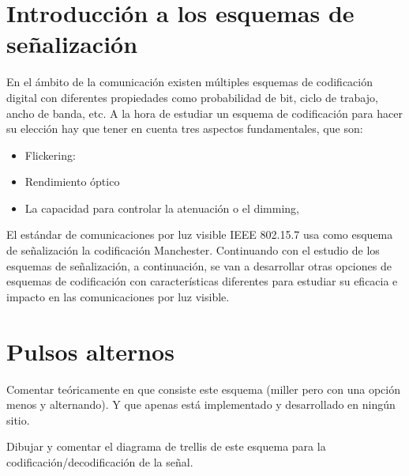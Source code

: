 
\label{chp:App}
\minitoc

\section{Introducción a los esquemas de señalización}

En el ámbito de la comunicación existen múltiples esquemas de codificación digital con diferentes propiedades como 
probabilidad de bit, ciclo de trabajo, ancho de banda, etc. A la hora de estudiar un esquema de codificación para hacer 
su elección hay que tener en cuenta tres aspectos fundamentales, que son:
\begin{itemize}
    \item Flickering: 
    \item Rendimiento óptico
    \item La capacidad para controlar la atenuación o el dimming, 
\end{itemize} 

El estándar de comunicaciones por luz visible IEEE 802.15.7 usa como esquema de señalización la codificación Manchester. 
Continuando con el estudio de los esquemas de señalización,
a continuación, se van a desarrollar otras opciones de esquemas de codificación con características diferentes
para estudiar su eficacia e impacto en las comunicaciones por luz visible.

\section{Pulsos alternos}
Comentar teóricamente en que consiste este esquema (miller pero con una opción menos y alternando).
Y que apenas está implementado y desarrollado en ningún sitio.

Dibujar y comentar el diagrama de trellis de este esquema para la codificación/decodificación de la señal.

